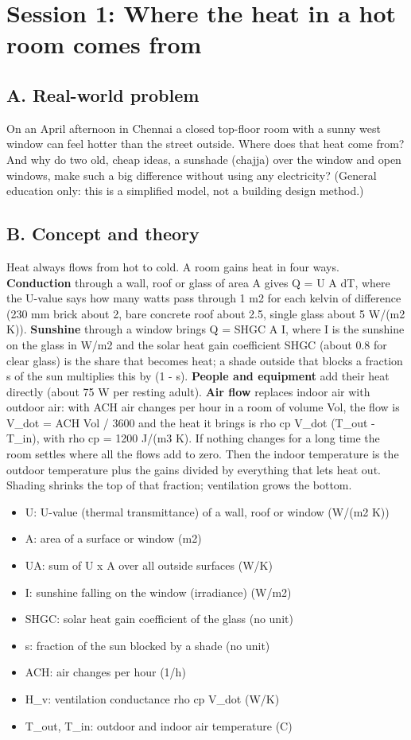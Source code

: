 \documentclass[11pt,a4paper]{article}
\begin{document}
\section{Session 1: Where the heat in a hot room comes from}

\subsection*{A. Real-world problem}
On an April afternoon in Chennai a closed top-floor room with a sunny west window can feel hotter than the street outside. Where does that heat come from? And why do two old, cheap ideas, a sunshade (chajja) over the window and open windows, make such a big difference without using any electricity? (General education only: this is a simplified model, not a building design method.)

\subsection*{B. Concept and theory}
Heat always flows from hot to cold. A room gains heat in four ways. \textbf{Conduction} through a wall, roof or glass of area A gives Q = U A dT, where the U-value says how many watts pass through 1 m2 for each kelvin of difference (230 mm brick about 2, bare concrete roof about 2.5, single glass about 5 W/(m2 K)). \textbf{Sunshine} through a window brings Q = SHGC A I, where I is the sunshine on the glass in W/m2 and the solar heat gain coefficient SHGC (about 0.8 for clear glass) is the share that becomes heat; a shade outside that blocks a fraction s of the sun multiplies this by (1 - s). \textbf{People and equipment} add their heat directly (about 75 W per resting adult). \textbf{Air flow} replaces indoor air with outdoor air: with ACH air changes per hour in a room of volume Vol, the flow is V\_dot = ACH Vol / 3600 and the heat it brings is rho cp V\_dot (T\_out - T\_in), with rho cp = 1200 J/(m3 K). If nothing changes for a long time the room settles where all the flows add to zero. Then the indoor temperature is the outdoor temperature plus the gains divided by everything that lets heat out. Shading shrinks the top of that fraction; ventilation grows the bottom.

\begin{itemize}[nosep]
\item U: U-value (thermal transmittance) of a wall, roof or window (W/(m2 K))
\item A: area of a surface or window (m2)
\item UA: sum of U x A over all outside surfaces (W/K)
\item I: sunshine falling on the window (irradiance) (W/m2)
\item SHGC: solar heat gain coefficient of the glass (no unit)
\item s: fraction of the sun blocked by a shade (no unit)
\item ACH: air changes per hour (1/h)
\item H\_v: ventilation conductance rho cp V\_dot (W/K)
\item T\_out, T\_in: outdoor and indoor air temperature (C)
\end{itemize}
\end{document}
